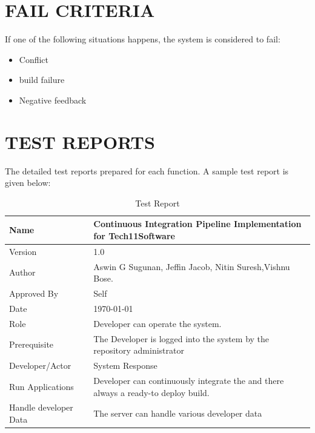 \documentclass[12pt,a4paper,oneside]{report}
\begin{document}
{\section{FAIL CRITERIA}
\par If one of the following situations happens, the system is considered to fail:
\begin{itemize}
\item	Conflict
\item   build failure
\item	Negative feedback
\end{itemize}
\section{TEST REPORTS}
The detailed test reports prepared for each function. A sample test report is given below:
\begin{table}[!htb]
\centering
\caption{Test Report}
\label{Test Report}
\begin{tabular}{|l|l|}
\hline
Name                                                                                & Continuous Integration Pipeline Implementation for Tech11Software                                               \\ \hline
Version                                                                             & 1.0                                                                  \\ \hline
Author                                                                              & Aswin G Sugunan, Jeffin Jacob, Nitin Suresh,Vishnu Bose.              \\ \hline
Approved By                                                                         & Self                                                                 \\ \hline
Date                                                                                & \today                                            \\ \hline
Role                                                                                & Developer can operate the system.                                          \\ \hline
Prerequisite                                                                        & The Developer is logged into the system by the repository administrator                                   \\ \hline
Developer/Actor                                                                          & System Response                                                      \\ \hline
Run Applications                                                                    & Developer can continuously integrate the and there always a ready-to deploy build. \\ \hline
Handle developer Data                                                                    &The server can handle various developer data                                                                      \\ \hline
                                                                                    

\end{tabular}
\end{table}}
\end{document}
